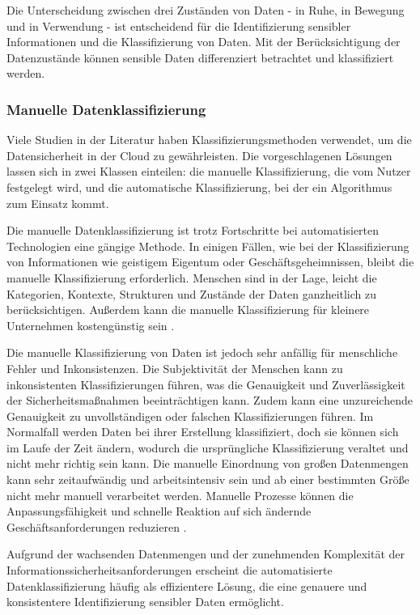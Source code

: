 Die Unterscheidung zwischen drei Zuständen von Daten - in Ruhe, in Bewegung und in Verwendung - ist entscheidend für die Identifizierung sensibler Informationen und die Klassifizierung von Daten. Mit der Berücksichtigung der Datenzustände können sensible Daten differenziert betrachtet und klassifiziert werden.


\subsubsection{Manuelle Datenklassifizierung}
Viele Studien in der Literatur haben Klassifizierungsmethoden verwendet, um die Datensicherheit in der Cloud zu gewährleisten. Die vorgeschlagenen Lösungen lassen sich in zwei Klassen einteilen: die manuelle Klassifizierung, die vom Nutzer festgelegt wird, und die automatische Klassifizierung, bei der ein Algorithmus zum Einsatz kommt.

Die manuelle Datenklassifizierung ist trotz Fortschritte bei automatisierten Technologien eine gängige Methode. In einigen Fällen, wie bei der Klassifizierung von Informationen wie geistigem Eigentum oder Geschäftsgeheimnissen, bleibt die manuelle Klassifizierung erforderlich. Menschen sind in der Lage, leicht die Kategorien, Kontexte, Strukturen und Zustände der Daten ganzheitlich zu berücksichtigen. Außerdem kann die manuelle Klassifizierung für kleinere Unternehmen kostengünstig sein \cite{Divadari.2023}\cite{Alsuwaie.2021}.

Die manuelle Klassifizierung von Daten ist jedoch sehr anfällig für menschliche Fehler und Inkonsistenzen. Die Subjektivität der Menschen kann zu inkonsistenten Klassifizierungen führen, was die Genauigkeit und Zuverlässigkeit der Sicherheitsmaßnahmen beeinträchtigen kann. Zudem kann eine unzureichende Genauigkeit zu unvollständigen oder falschen Klassifizierungen führen. Im Normalfall werden Daten bei ihrer Erstellung klassifiziert, doch sie können sich im Laufe der Zeit ändern, wodurch die ursprüngliche Klassifizierung veraltet und nicht mehr richtig sein kann. Die manuelle Einordnung von großen Datenmengen kann sehr zeitaufwändig und arbeitsintensiv sein und ab einer bestimmten Größe nicht mehr manuell verarbeitet werden. Manuelle Prozesse können die Anpassungsfähigkeit und schnelle Reaktion auf sich ändernde Geschäftsanforderungen reduzieren \cite{Venhorst.2019}.

Aufgrund der wachsenden Datenmengen und der zunehmenden Komplexität der Informationssicherheitsanforderungen erscheint die automatisierte Datenklassifizierung häufig als effizientere Lösung, die eine genauere und konsistentere Identifizierung sensibler Daten ermöglicht.

